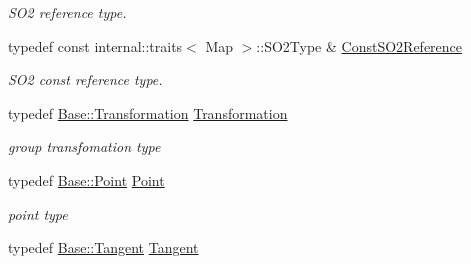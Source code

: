 \begin{DoxyCompactItemize}
\begin{DoxyCompactList}\small\item\em S\+O2 reference type. \end{DoxyCompactList}\item 
typedef const internal\+::traits$<$ Map $>$\+::S\+O2\+Type \& \hyperlink{class_eigen_1_1_map_3_01_sophus_1_1_s_e2_group_3_01___scalar_01_4_00_01___options_01_4_a95a0f0d5cfa5b98c73129061e9f895eb}{Const\+S\+O2\+Reference}\hypertarget{class_eigen_1_1_map_3_01_sophus_1_1_s_e2_group_3_01___scalar_01_4_00_01___options_01_4_a95a0f0d5cfa5b98c73129061e9f895eb}{}\label{class_eigen_1_1_map_3_01_sophus_1_1_s_e2_group_3_01___scalar_01_4_00_01___options_01_4_a95a0f0d5cfa5b98c73129061e9f895eb}

\begin{DoxyCompactList}\small\item\em S\+O2 const reference type. \end{DoxyCompactList}\item 
typedef \hyperlink{class_sophus_1_1_s_e2_group_base_a82fe531d4b64813525d4ebd131da9bcd}{Base\+::\+Transformation} \hyperlink{class_eigen_1_1_map_3_01_sophus_1_1_s_e2_group_3_01___scalar_01_4_00_01___options_01_4_aa0679ea66e90d4b033fb6f8ee39353d3}{Transformation}\hypertarget{class_eigen_1_1_map_3_01_sophus_1_1_s_e2_group_3_01___scalar_01_4_00_01___options_01_4_aa0679ea66e90d4b033fb6f8ee39353d3}{}\label{class_eigen_1_1_map_3_01_sophus_1_1_s_e2_group_3_01___scalar_01_4_00_01___options_01_4_aa0679ea66e90d4b033fb6f8ee39353d3}

\begin{DoxyCompactList}\small\item\em group transfomation type \end{DoxyCompactList}\item 
typedef \hyperlink{class_sophus_1_1_s_e2_group_base_add8b024098bc6fcecdefb42229fa881b}{Base\+::\+Point} \hyperlink{class_eigen_1_1_map_3_01_sophus_1_1_s_e2_group_3_01___scalar_01_4_00_01___options_01_4_aad5a573c1e69585f2d5b54a404d83053}{Point}\hypertarget{class_eigen_1_1_map_3_01_sophus_1_1_s_e2_group_3_01___scalar_01_4_00_01___options_01_4_aad5a573c1e69585f2d5b54a404d83053}{}\label{class_eigen_1_1_map_3_01_sophus_1_1_s_e2_group_3_01___scalar_01_4_00_01___options_01_4_aad5a573c1e69585f2d5b54a404d83053}

\begin{DoxyCompactList}\small\item\em point type \end{DoxyCompactList}\item 
typedef \hyperlink{class_sophus_1_1_s_e2_group_base_a71b41e6cde48514241c7bffcbe34923f}{Base\+::\+Tangent} \hyperlink{class_eigen_1_1_map_3_01_sophus_1_1_s_e2_group_3_01___scalar_01_4_00_01___options_01_4_a0e620eca865271b3b9bcb2c75dfbf2fa}{Tangent}\hypertarget{class_eigen_1_1_map_3_01_sophus_1_1_s_e2_group_3_01___scalar_01_4_00_01___options_01_4_a0e620eca865271b3b9bcb2c75dfbf2fa}{}\label{class_eigen_1_1_map_3_01_sophus_1_1_s_e2_group_3_01___scalar_01_4_00_01___options_01_4_a0e620eca865271b3b9bcb2c75dfbf2fa}


\end{DoxyCompactItemize}
